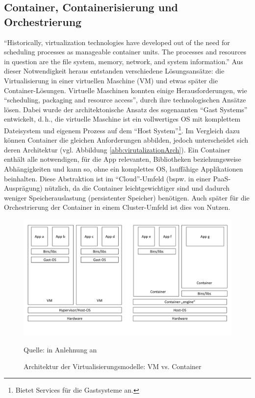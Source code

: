 \subsection{Container, Containerisierung und Orchestrierung}\label{kap:container}
\enquote{Historically, virtualization technologies have developed out of the need for scheduling processes as manageable container units. The processes and resources in question are the file system, memory, network, and system information.}\autocite[][S.\,25]{pahl_containerization_2015} Aus dieser Notwendigkeit heraus entstanden verschiedene Lösungsansätze: die Virtualisierung in einer virtuellen Maschine (\ac{VM}) und etwas später die Container-Lösungen. Virtuelle Maschinen konnten einige Herausforderungen, wie \enquote{scheduling, packaging and resource access}, durch ihre technologischen Ansätze lösen. Dabei wurde der architektonische Ansatz des sogenannten \enquote{Gast Systems} entwickelt, d.\,h., die virtuelle Maschine ist ein vollwertiges \ac{OS} mit komplettem Dateisystem und eigenem Prozess auf dem \enquote{Host System}\footnote{Bietet Services für die Gastsysteme an.}. Im Vergleich dazu können Container die gleichen Anforderungen abbilden, jedoch unterscheidet sich deren Architektur (vgl. Abbildung \vref{abb:virutalizationArch}). Ein Container enthält alle notwendigen, für die App relevanten, Bibliotheken beziehungsweise Abhängigkeiten und kann so, ohne ein komplettes \ac{OS}, lauffähige Applikationen beinhalten. Diese Abstraktion ist im \enquote{Cloud}-Umfeld (bspw. in einer \ac{PaaS}-Ausprägung) nützlich, da die Container leichtgewichtiger sind und dadurch weniger Speicherauslastung (persistenter Speicher) benötigen. Auch später für die Orchestrierung der Container in einem Cluster-Umfeld ist dies von Nutzen. 

\begin{figure}[h!]
	\centering
	\includegraphics[scale=0.44]{img/virtualization architecture.pdf}
	\caption{Architektur der Virtualisierungsmodelle: VM vs. Container}
	{\footnotesize Quelle: in Anlehnung an \cite{pahl_containerization_2015}}
	\label{abb:virutalizationArch}
\end{figure}

